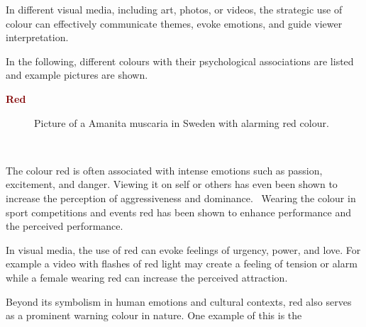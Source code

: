 \documentclass[../MasterThesis.tex]{subfiles}
\begin{document}
In different visual media, including art, photos, or videos, the strategic use of colour can effectively communicate themes, evoke emotions, and guide viewer interpretation.~\cite{cc_cg_1, cc_cg_2, colour}


In the following, different colours with their psychological associations are listed and example pictures are shown.



\textbf{\textcolor{Maroon}{Red}}

%
%

\begin{minipage}{0.5\textwidth}
	\begin{figure}[H]
		\begin{center}
			\label{figure:red}
			\caption[Picture of a Amanita muscaria in Sweden with alarming red colour.]{Picture of a Amanita muscaria in Sweden with alarming red colour.}
		\end{center}
	\end{figure} \hfill
\end{minipage}\begin{minipage}{0.05\textwidth}
	\ 
\end{minipage}\begin{minipage}{0.45\textwidth}
	The colour red is often associated with intense emotions such as passion, excitement, and danger. Viewing it on self or others has even been shown to increase the perception of aggressiveness and dominance.~\cite{red_dominance} Wearing the colour in sport competitions and events red has been shown to enhance performance and the perceived performance.~\cite{colour, red_sport}
	
	In visual media, the use of red can evoke feelings of urgency, power, and love. For example a video with flashes of red light may create a feeling of tension or alarm while a female wearing red can increase the perceived attraction.~\cite{colour, red_romance}
	
	Beyond its symbolism in human emotions and cultural contexts, red also serves as a prominent warning colour in nature. One example of this is the
	
\end{minipage}
\end{document}
